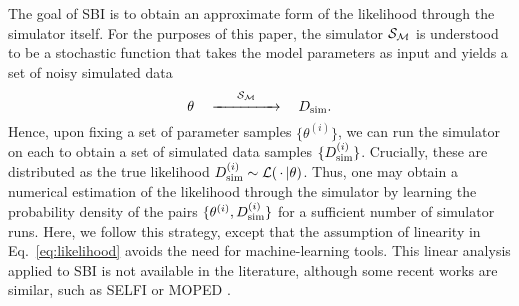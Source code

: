 \documentclass[%
 reprint,
 amsmath,amssymb,
 aps,
]{revtex4-2}
\begin{document}
The goal of SBI is to obtain an approximate form of the likelihood through the simulator itself. For the purposes of this paper, the simulator $\mathcal{S}_{\mathcal{M}}$ is understood to be a stochastic function that takes the model parameters as input and yields a set of noisy simulated data
\begin{equation} \label{eq:simulator}
	\theta \quad \overset{\mathcal{S}_{\mathcal{M}}}{\xrightarrow{\hspace*{1.5cm}}} \quad D_\text{sim}.
\end{equation}
Hence, upon fixing a set of parameter samples $\{\theta^{(i)}\}$, we can run the simulator on each to obtain a set of simulated data samples $\{D^{(i)}_\text{sim}\}$. Crucially, these are distributed as the true likelihood $D^{(i)}_\text{sim}\sim \mathcal{L}(\,\cdot\,|\theta)$. Thus, one may obtain a numerical estimation of the likelihood through the simulator by learning the probability density of the pairs $\{\theta^{(i)},D_\text{sim}^{(i)}\}$ for a sufficient number of simulator runs. Here, we follow this strategy, except that the assumption of linearity in Eq.~\ref{eq:likelihood} avoids the need for machine-learning tools. This linear analysis applied to SBI is not available in the literature, although some recent works are similar, such as SELFI \cite{leclercq2019primordial} or MOPED \cite{heavens2000massive}.
\end{document}
